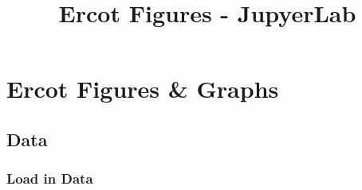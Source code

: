 \documentclass[11pt]{article}
\title{Ercot Figures - JupyerLab}
\begin{document}
    
    
    \maketitle
    
    

    
    \section{Ercot Figures \& Graphs}\label{ercot-figures-graphs}

    \subsection{Data}\label{data}

    \subsubsection{Load in Data}\label{load-in-data}
\end{document}
